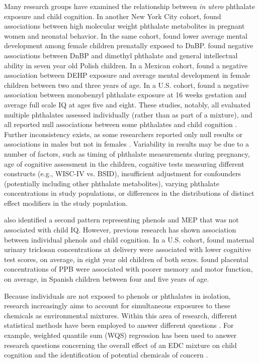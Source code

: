 Many research groups have examined the relationship between \textit{in utero} phthalate exposure and child cognition. In another New York City cohort, \citet{engel2009prenatal} found associations between high molecular weight phthalate metabolites in pregnant women and neonatal behavior. In the same cohort, \citet{doherty2017prenatal} found lower average mental development among female children prenatally exposed to DnBP. \citet{jankowska2019phthalate} found negative associations between DnBP and dimethyl phthalate and general intellectual ability in seven year old Polish children. In a Mexican cohort, \citet{tellez2013prenatal} found a negative association between DEHP exposure and average mental development in female children between two and three years of age. In a U.S. cohort, \citet{li2019identifying} found a negative association between monobenzyl phthalate exposure at 16 weeks gestation and average full scale IQ at ages five and eight. These studies, notably, all evaluated multiple phthalates assessed individually (rather than as part of a mixture), and all reported null associations between some phthalates and child cognition \cite{radke2020phthalate}. Further inconsistency exists, as some researchers reported only null results \cite{hyland2019prenatal, nakiwala2018utero} or associations in males but not in females \cite{zhu2020domain, torres2020early, kim2011prenatal}. Variability in results may be due to a number of factors, such as timing of phthalate measurements during pregnancy, age of cognitive assessment in the children, cognitive tests measuring different constructs (e.g., WISC-IV vs. BSID), insufficient adjustment for confounders (potentially including other phthalate metabolites), varying phthalate concentrations in study populations, or differences in the distributions of distinct effect modifiers in the study population. 

\bnmf also identified a second pattern representing phenols and MEP that was not associated with child IQ. However, previous 
research has shown association between individual phenols and child cognition. In a U.S. cohort, \citet{jackson2018identifying} found maternal urinary triclosan concentrations at delivery were associated with lower cognitive test scores, on average, in eight year old children of both sexes. \citet{freire2020association} found placental concentrations of PPB were associated with poorer memory and motor function, on average, in Spanish children between four and five years of age.

Because individuals are not exposed to phenols or phthalates in isolation, research increasingly aims to account for simultaneous exposures to these chemicals as environmental mixtures. Within this area of research, different statistical methods have been employed to answer different questions \cite{gibson2019complex}. For example, weighted quantile sum (WQS) regression has been used to answer research questions concerning the overall effect of an EDC mixture on child cognition and the identification of potential chemicals of concern \cite{tanner2020early, loftus2021exposure}.

